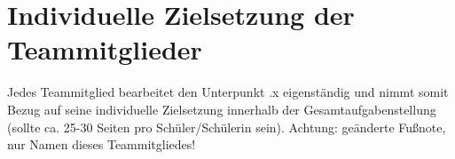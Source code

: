 \chapter{Individuelle Zielsetzung der Teammitglieder}\label{chp:individual}

Jedes Teammitglied bearbeitet den Unterpunkt .x eigenständig und
nimmt somit Bezug auf seine individuelle Zielsetzung innerhalb der Gesamtaufgabenstellung (sollte ca. 25-30 Seiten pro Schüler/Schülerin sein).
Achtung: geänderte Fußnote, nur Namen dieses Teammitgliedes!




